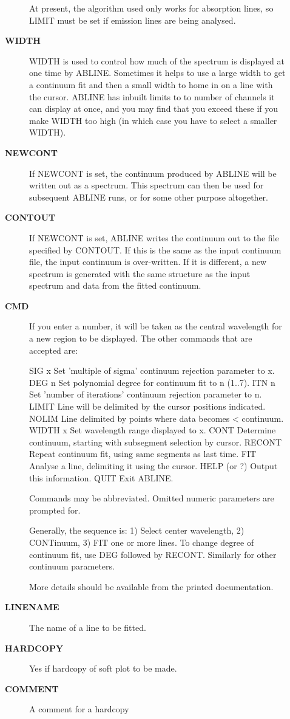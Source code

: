 \begin{description}
\begin{description}
 At present, the algorithm used only works for absorption lines, so
 LIMIT must be set if emission lines are being analysed.
\item [{\bf WIDTH}]
 WIDTH is used to control how much of the spectrum is displayed at one
 time by ABLINE.  Sometimes it helps to use a large width to get a
 continuum fit and then a small width to home in on a line with the
 cursor.  ABLINE has inbuilt limits to to number of channels it can
 display at once, and you may find that you exceed these if you make
 WIDTH too high (in which case you have to select a smaller WIDTH).
\item [{\bf NEWCONT}]
 If NEWCONT is set, the continuum produced by ABLINE will be
 written out as a spectrum.  This spectrum can then be used for
 subsequent ABLINE runs, or for some other purpose altogether.
\item [{\bf CONTOUT}]
 If NEWCONT is set, ABLINE writes the continuum out to the file
 specified by CONTOUT.  If this is the same as the input continuum
 file, the input continuum is over-written.  If it is different, a new
 spectrum is generated with the same structure as the input spectrum
 and data from the fitted continuum.
\item [{\bf CMD}]
 If you enter a number, it will be taken as the central wavelength for
 a new region to be displayed.  The other commands that are accepted
 are:

   SIG x     Set 'multiple of sigma' continuum rejection parameter
             to x.
   DEG n     Set polynomial degree for continuum fit to n (1..7).
   ITN n     Set 'number of iterations' continuum rejection parameter
             to n.
   LIMIT     Line will be delimited by the cursor positions indicated.
   NOLIM     Line delimited by points where data becomes < continuum.
   WIDTH x   Set wavelength range displayed to x.
   CONT      Determine continuum, starting with subsegment selection
             by cursor.
   RECONT    Repeat continuum fit, using same segments as last time.
   FIT       Analyse a line, delimiting it using the cursor.
   HELP      (or ?) Output this information.
   QUIT      Exit ABLINE.

 Commands may be abbreviated.  Omitted numeric parameters are
 prompted for.

 Generally, the sequence is: 1) Select center wavelength,
 2) CONTinuum, 3) FIT one or more lines.  To change degree of
 continuum fit, use DEG followed by RECONT.  Similarly for other
 continuum parameters.

 More details should be available from the printed documentation.
\item [{\bf LINENAME}]
 The name of a line to be fitted.
\item [{\bf HARDCOPY}]
 Yes if hardcopy of soft plot to be made.
\item [{\bf COMMENT}]
 A comment for a hardcopy
\end{description}


\end{description}
